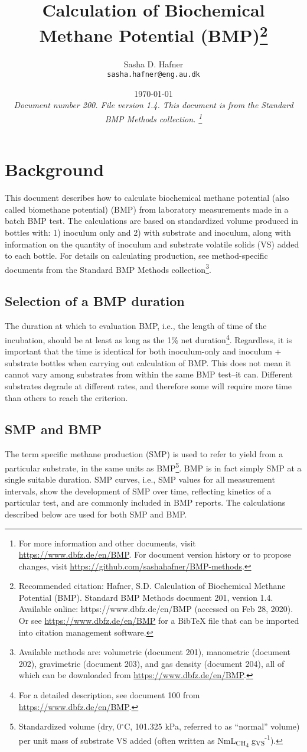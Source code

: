 \documentclass[]{article}
\title {Calculation of Biochemical Methane Potential (BMP)\footnote{
  Recommended citation: 
Hafner, S.D. Calculation of Biochemical Methane Potential (BMP). Standard BMP Methods document 201, version 1.4. Available online: https://www.dbfz.de/en/BMP (accessed on Feb 28, 2020).
\newline
  Or see \url{https://www.dbfz.de/en/BMP} for a BibTeX file that can be imported into citation management software.
}}
\author{Sasha D. Hafner\\
\texttt{sasha.hafner@eng.au.dk}
}
\date{\today \\
\bigskip
\textit{
  Document number 200.
  File version 1.4. 
  This document is from the Standard BMP Methods collection.
    \footnote{For more information and other documents, visit \url{https://www.dbfz.de/en/BMP}. 
    For document version history or to propose changes, visit \url{https://github.com/sashahafner/BMP-methods}.}
}
}
\begin{document}
\maketitle

\section{Background}
This document describes how to calculate biochemical methane potential (also called biomethane potential) (BMP) from laboratory measurements made in a batch BMP test.
The calculations are based on standardized  volume produced in bottles with: 1) inoculum only and 2) with substrate and inoculum, along with information on the quantity of inoculum and substrate volatile solids (VS) added to each bottle.
For details on calculating  production, see method-specific documents from the Standard BMP Methods collection\footnote{
  Available methods are: volumetric (document 201), manometric (document 202), gravimetric (document 203), and gas density (document 204), all of which can be downloaded from \url{https://www.dbfz.de/en/BMP}.
}.

\subsection{Selection of a BMP duration}
The duration at which to evaluation BMP, i.e., the length of time of the incubation, should be at least as long as the 1\% net duration\footnote{
  For a detailed description, see document 100 from \url{https://www.dbfz.de/en/BMP}.
}.
Regardless, it is important that the time is identical for both inoculum-only and inoculum + substrate bottles when carrying out calculation of BMP.
This does not mean it cannot vary among substrates from within the same BMP test--it can.
Different substrates degrade at different rates, and therefore some will require more time than others to reach the criterion.

\subsection{SMP and BMP}
The term specific methane production (SMP) is used to refer to  yield from a particular substrate, in the same units as BMP\footnote{
Standardized  volume (dry, 0$^\circ$C, 101.325 kPa, referred to as ``normal'' volume) per unit mass of substrate VS added (often written as NmL\textsubscript{CH\textsubscript{4}} g\textsubscript{VS}\textsuperscript{-1}).
}.
BMP is in fact simply SMP at a single suitable duration.
SMP curves, i.e., SMP values for all measurement intervals, show the development of SMP over time, reflecting kinetics of a particular test, and are commonly included in BMP reports.
The calculations described below are used for both SMP and BMP.
\end{document}
